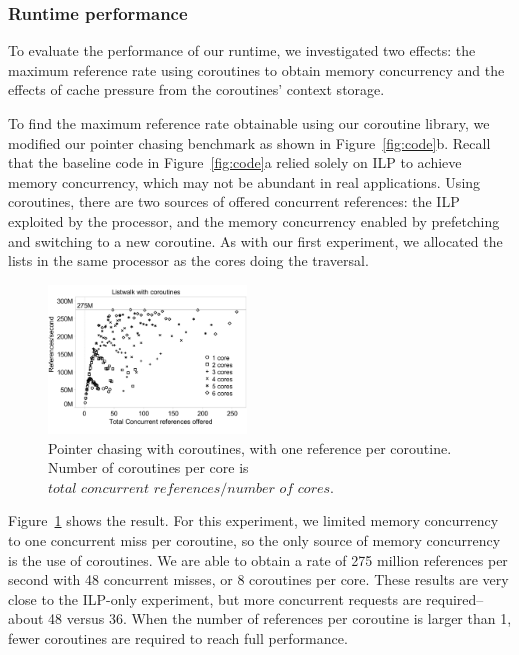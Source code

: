\documentclass[10pt,nocopyrightspace,preprint]{sigplanconf}
\begin{document}
{\subsubsection{Runtime performance}

To evaluate the performance of our runtime, we investigated two
effects: the maximum reference rate using coroutines
to obtain memory concurrency and the effects of cache pressure from the
coroutines' context storage. 

To find the maximum reference rate obtainable using our coroutine
library, we modified our pointer chasing benchmark as shown in
Figure~\ref{fig:code}b. Recall that the baseline code in Figure~\ref{fig:code}a relied solely on ILP to achieve memory concurrency, which may not be abundant in real applications. Using coroutines, there are two sources of offered
concurrent references: the ILP exploited by the processor, and the
memory concurrency enabled by prefetching and switching to a new
coroutine. As with our first experiment, we allocated the lists in the
same processor as the cores doing the traversal. 

\begin{figure}[h]
  \begin{center}
    \includegraphics[width=0.47\textwidth]{figures/multi-green-edited.pdf}
  \end{center}
  \caption{Pointer chasing with coroutines, with one reference per
    coroutine. Number of coroutines per core is $\textit{total concurrent references} / \textit{number of cores}$.}
  \label{fig:multi-green}
\end{figure}

Figure~\ref{fig:multi-green} shows the result. For this
experiment, we limited memory concurrency to one concurrent miss per
coroutine, so the only source of memory concurrency is the use of
coroutines. We are able to obtain a rate of 275 million references per
second with 48 concurrent misses, or 8 coroutines per core. These
results are very close to the ILP-only experiment, but more concurrent requests are required--about 48 versus 36. When the number of references per coroutine is larger than 1, fewer coroutines are required to reach full performance.

}
\end{document}
